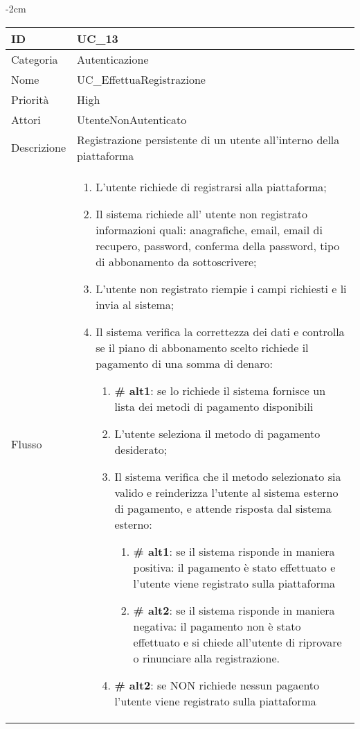 \begin{center}
\begin{table}[bp]
    \centering
    \addtolength{\leftskip} {-2cm}
\begin{tabular}{ |p{2.6cm}|p{13cm}|  }
\hline
ID & UC\_13 \\\hline
Categoria & Autenticazione \\\hline
Nome & UC\_EffettuaRegistrazione \\\hline
Priorità & High \\\hline
Attori &  UtenteNonAutenticato \\\hline
Descrizione & Registrazione persistente di un utente all'interno della piattaforma \\\hline
Flusso &  	\begin{enumerate}
			\item L'utente richiede di registrarsi alla piattaforma;
			\item Il sistema richiede all' utente non registrato informazioni quali: anagrafiche, email, email di recupero, password, conferma della password, tipo di abbonamento da sottoscrivere;
			\item L'utente non registrato riempie i campi richiesti e li invia al sistema;
			\item Il sistema verifica la correttezza dei dati e controlla se il piano di abbonamento scelto richiede il pagamento di una somma di denaro:
			\begin{enumerate}[  ]
				\item\textbf{\# alt1}: se lo richiede il sistema fornisce un lista dei metodi di pagamento disponibili
				\item L'utente seleziona il metodo di pagamento desiderato;
				\item Il sistema verifica che il metodo selezionato sia valido e reinderizza l'utente al sistema esterno di pagamento, e attende risposta dal sistema esterno:
				\begin{enumerate}[label*=\arabic*.]
					\item \textbf{\# alt1}: se il sistema risponde in maniera positiva: il pagamento è stato effettuato e l'utente viene registrato sulla piattaforma 
					\item \textbf{\# alt2}: se il sistema risponde in maniera negativa: il pagamento non è stato effettuato e si chiede all'utente di riprovare o rinunciare alla registrazione.
				\end{enumerate}
				\item\textbf{\# alt2}: se NON richiede nessun pagaento l'utente viene registrato sulla piattaforma

\end{enumerate}
\end{enumerate}
\end{tabular}
\end{table}
\end{center}

